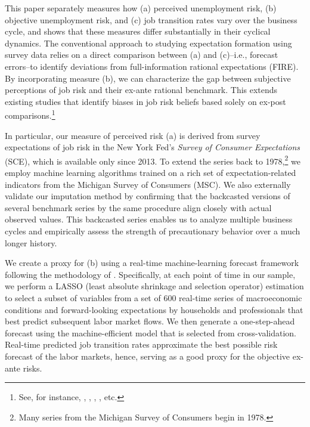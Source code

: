 This paper separately measures how (a) perceived unemployment risk, (b) objective unemployment risk, and (c) job transition rates vary over the business cycle, and shows that these measures differ substantially in their cyclical dynamics. The conventional approach to studying expectation formation using survey data relies on a direct comparison between (a) and (c)--i.e., forecast errors--to identify deviations from full-information rational expectations (FIRE). By incorporating measure (b), we can characterize the gap between subjective perceptions of job risk and their ex-ante rational benchmark. This extends existing studies that identify biases in job risk beliefs based solely on ex-post comparisons.\footnote{See, for instance, \cite{stephens2004job}, \cite{spinnewijn2015unemployed}, \cite{mueller2021job}, \cite{balleer2021effects}, etc. } 


In particular, our measure of perceived risk (a) is derived from survey expectations of job risk in the New York Fed’s \emph{Survey of Consumer Expectations} (SCE), which is available only since 2013. To extend the series back to 1978,\footnote{Many series from the Michigan Survey of Consumers begin in 1978.} we employ machine learning algorithms trained on a rich set of expectation-related indicators from the Michigan Survey of Consumers (MSC). We also externally validate our imputation method by confirming that the backcasted versions of several benchmark series by the same procedure align closely with actual observed values. This backcasted series enables us to analyze multiple business cycles and empirically assess the strength of precautionary behavior over a much longer history. 


We create a proxy for (b) using a real-time machine-learning forecast framework following the methodology of \cite{bianchi2022belief}. Specifically, at each point of time in our sample, we perform a LASSO (least absolute shrinkage and selection operator) estimation to select a subset of variables from a set of 600 real-time series of macroeconomic conditions and forward-looking expectations by households and professionals that best predict subsequent labor market flows. We then generate a one-step-ahead forecast using the machine-efficient model that is selected from cross-validation. Real-time predicted job transition rates approximate the best possible risk forecast of the labor markets, hence, serving as a good proxy for the objective ex-ante risks.  



